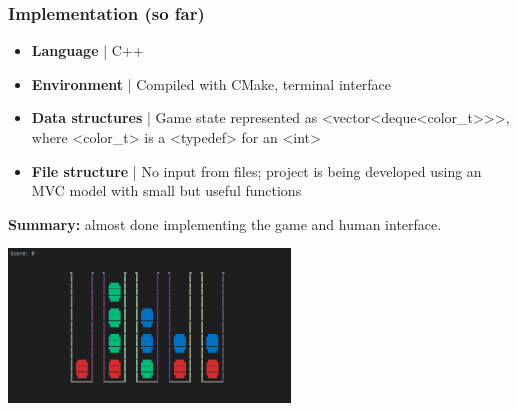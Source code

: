 \documentclass{beamer}
\def\texttt#1{<#1>}
\begin{document}
\begin{frame}
\frametitle{Implementation (so far)}

\begin{itemize}
  \item \textbf{Language} | C++
  \item \textbf{Environment} | Compiled with CMake, terminal interface
  \item \textbf{Data structures} | Game state represented as \texttt{vector<deque<color\_t>>}, where \texttt{color\_t} is a \texttt{typedef} for an \texttt{int}
  \item \textbf{File structure} | No input from files; project is being developed using an MVC model with small but useful functions
\end{itemize}

\textbf{Summary:} almost done implementing the game and human interface.

\begin{center}
  \includegraphics[width=75mm]{img/game-interface.png}
\end{center}

\end{frame}
\end{document}
